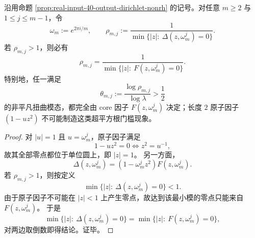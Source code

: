 \begin{theorem}\label{thm:xi-square-root-threshold-core-irreducibility}
沿用命题 \ref{prop:real-input-40-output-dirichlet-nonrh} 的记号。对任意 \(m\ge 2\) 与 \(1\le j\le m-1\)，令
\[
\omega_m:=e^{2\pi i/m},
\qquad
\rho_{m,j}:=\frac{1}{\min\{|z|:\ \Delta(z,\omega_m^j)=0\}}.
\]
若 \(\rho_{m,j}>1\)，则必有
\[
\boxed{\;
\rho_{m,j}
=
\frac{1}{\min\{|z|:\ F(z,\omega_m^j)=0\}}.\;}
\]
特别地，任一满足
\[
\theta_{m,j}:=\frac{\log\rho_{m,j}}{\log\lambda}>\frac12
\]
的非平凡扭曲模态，都完全由 core 因子 \(F(z,\omega_m^j)\) 决定；长度 \(2\) 原子因子 \((1-uz^2)\) 不可能制造这类超平方根门槛现象。
\end{theorem}
\begin{proof}
对 \(|u|=1\) 且 \(u=\omega_m^j\)，原子因子满足
\[
1-uz^2=0
\iff
z^2=u^{-1},
\]
故其全部零点都位于单位圆上，即 \(|z|=1\)。
另一方面，
\[
\Delta(z,\omega_m^j)=(1-\omega_m^j z^2)F(z,\omega_m^j).
\]
若 \(\rho_{m,j}>1\)，则按定义
\[
\min\{|z|:\ \Delta(z,\omega_m^j)=0\}<1.
\]
由于原子因子不可能在 \(|z|<1\) 上产生零点，故达到该最小模的零点只能来自 \(F(z,\omega_m^j)\)。
于是
\[
\min\{|z|:\ \Delta(z,\omega_m^j)=0\}
=
\min\{|z|:\ F(z,\omega_m^j)=0\},
\]
对两边取倒数即得结论。证毕。
\end{proof}

